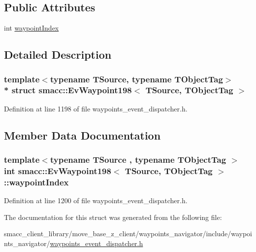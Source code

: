 \subsection*{Public Attributes}
\begin{DoxyCompactItemize}
\item 
int \hyperlink{structsmacc_1_1EvWaypoint198_a78b45091a850f3dc41b329fce1012fc0}{waypoint\+Index}
\end{DoxyCompactItemize}


\subsection{Detailed Description}
\subsubsection*{template$<$typename T\+Source, typename T\+Object\+Tag$>$\\*
struct smacc\+::\+Ev\+Waypoint198$<$ T\+Source, T\+Object\+Tag $>$}



Definition at line 1198 of file waypoints\+\_\+event\+\_\+dispatcher.\+h.



\subsection{Member Data Documentation}
\subsubsection[{\texorpdfstring{waypoint\+Index}{waypointIndex}}]{\setlength{\rightskip}{0pt plus 5cm}template$<$typename T\+Source , typename T\+Object\+Tag $>$ int {\bf smacc\+::\+Ev\+Waypoint198}$<$ T\+Source, T\+Object\+Tag $>$\+::waypoint\+Index}\hypertarget{structsmacc_1_1EvWaypoint198_a78b45091a850f3dc41b329fce1012fc0}{}\label{structsmacc_1_1EvWaypoint198_a78b45091a850f3dc41b329fce1012fc0}


Definition at line 1200 of file waypoints\+\_\+event\+\_\+dispatcher.\+h.



The documentation for this struct was generated from the following file\+:\begin{DoxyCompactItemize}
\item 
smacc\+\_\+client\+\_\+library/move\+\_\+base\+\_\+z\+\_\+client/waypoints\+\_\+navigator/include/waypoints\+\_\+navigator/\hyperlink{waypoints__event__dispatcher_8h}{waypoints\+\_\+event\+\_\+dispatcher.\+h}\end{DoxyCompactItemize}

